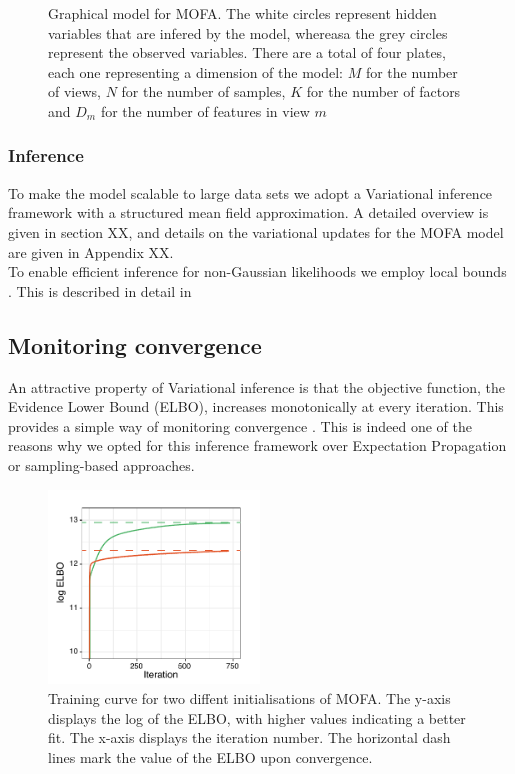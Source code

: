 \begin{figure}[H]
	\centering
	
	\caption{Graphical model for MOFA. The white circles represent hidden variables that are infered by the model, whereasa the grey circles represent the observed variables. There are a total of four plates, each one representing a dimension of the model: $M$ for the number of views, $N$ for the number of samples, $K$ for the number of factors and $D_m$ for the number of features in view $m$}
	\label{fig:MOFA_graphical_model}
\end{figure}

\subsubsection{Inference}
To make the model scalable to large data sets we adopt a Variational inference framework with a structured mean field approximation. 
A detailed overview is given in section XX, and details on the variational updates for the MOFA model are given in Appendix XX.\\
To enable efficient inference for non-Gaussian likelihoods we employ local bounds \cite{Jaakkola2000,Seeger2012}. This is described in detail in 

\subsection{Monitoring convergence}
An attractive property of Variational inference is that the objective function, the Evidence Lower Bound (ELBO), increases monotonically at every iteration. This provides a simple way of monitoring convergence . This is indeed one of the reasons why we opted for this inference framework over Expectation Propagation or sampling-based approaches.

 \begin{figure}[H]
	\centering 	
	\includegraphics[width=0.5\textwidth]{elbo_convergence}
	\caption{Training curve for two diffent initialisations of MOFA. The y-axis displays the log of the ELBO, with higher values indicating a better fit. The x-axis displays the iteration number. The horizontal dash lines mark the value of the ELBO upon convergence. }
	\label{fig:elbo_convergence}
\end{figure}

